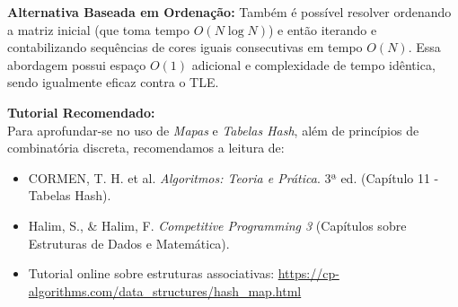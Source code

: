 \documentclass[11pt]{article}
\begin{document}
\begin{notebox}
\textbf{Alternativa Baseada em Ordenação:} 
Também é possível resolver ordenando a matriz inicial (que toma tempo $O(N \log N)$) e então iterando e contabilizando sequências de cores iguais consecutivas em tempo $O(N)$. Essa abordagem possui espaço $O(1)$ adicional e complexidade de tempo idêntica, sendo igualmente eficaz contra o TLE.
\end{notebox}

\begin{notebox}
\textbf{Tutorial Recomendado:} \\
Para aprofundar-se no uso de \textit{Mapas} e \textit{Tabelas Hash}, além de princípios de combinatória discreta, recomendamos a leitura de:
\begin{itemize}
    \item CORMEN, T. H. et al. \textit{Algoritmos: Teoria e Prática}. 3ª ed. (Capítulo 11 - Tabelas Hash).
    \item Halim, S., \& Halim, F. \textit{Competitive Programming 3} (Capítulos sobre Estruturas de Dados e Matemática).
    \item Tutorial online sobre estruturas associativas: \url{https://cp-algorithms.com/data_structures/hash_map.html}
\end{itemize}
\end{notebox}

\end{document}
